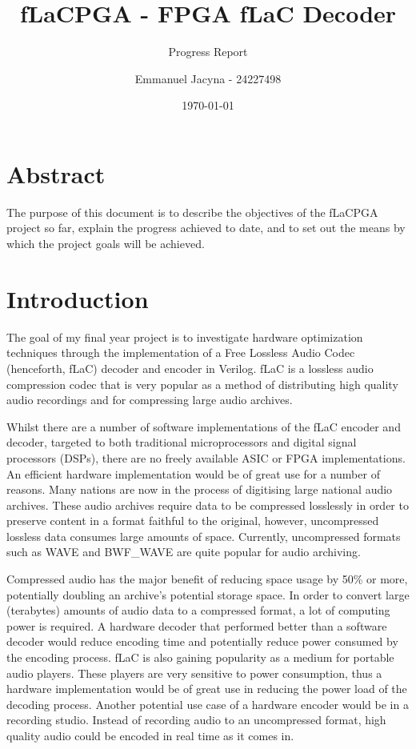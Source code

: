 \documentclass[12pt]{scrartcl}
\title{fLaCPGA - FPGA fLaC Decoder}
\subtitle{Progress Report}
\author{Emmanuel Jacyna - 24227498}
\date{\today}
\begin{document}
\pagestyle{myheadings}
  \maketitle
  \tableofcontents
  
  \section*{Abstract}
  The purpose of this document is to describe the objectives of the fLaCPGA project so far, explain the progress achieved to date, and to set out the means by which the project goals will be achieved.
  \section{Introduction}
  The goal of my final year project is to investigate hardware optimization techniques through the implementation of a Free Lossless Audio Codec (henceforth, fLaC) decoder and encoder in Verilog. fLaC is a lossless audio compression codec that is very popular as a method of distributing high quality audio recordings and for compressing large audio archives\cite{flac_popular}. 
  
  Whilst there are a number of software implementations of the fLaC encoder and decoder, targeted to both traditional microprocessors and digital signal processors (DSPs), there are no freely available ASIC or FPGA implementations. An efficient hardware implementation would be of great use for a number of reasons. Many nations are now in the process of digitising large national audio archives. These audio archives require data to be compressed losslessly in order to preserve content in a format faithful to the original, however, uncompressed lossless data consumes large amounts of space. Currently, uncompressed formats such as WAVE and BWF\_WAVE are quite popular for audio archiving\cite{pres_fmts}. 
  
  Compressed audio has the major benefit of reducing space usage by 50\% or more, potentially doubling an archive's potential storage space. In order to convert large (terabytes) amounts of audio data to a compressed format, a lot of computing power is required. A hardware decoder that performed better than a software decoder would reduce encoding time and potentially reduce power consumed by the encoding process. fLaC is also gaining popularity as a medium for portable audio players. These players are very sensitive to power consumption, thus a hardware implementation would be of great use in reducing the power load of the decoding process. Another potential use case of a hardware encoder would be in a recording studio. Instead of recording audio to an uncompressed format, high quality audio could be encoded in real time as it comes in.
  
\end{document}
